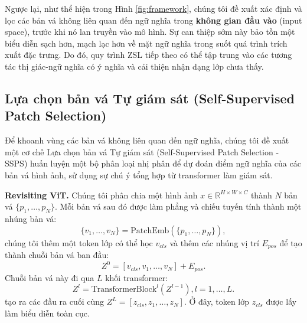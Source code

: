 Ngược lại, như thể hiện trong Hình \ref{fig:framework}, chúng tôi đề xuất xác định và lọc các bản vá không liên quan đến ngữ nghĩa trong \textbf{không gian đầu vào} (input space), trước khi nó lan truyền vào mô hình. Sự can thiệp sớm này bảo tồn một biểu diễn sạch hơn, mạch lạc hơn về mặt ngữ nghĩa trong suốt quá trình trích xuất đặc trưng. Do đó, quy trình ZSL tiếp theo có thể tập trung vào các tương tác thị giác-ngữ nghĩa có ý nghĩa và cải thiện nhận dạng lớp chưa thấy.

\subsection{Lựa chọn bản vá Tự giám sát (Self-Supervised Patch Selection)}
Để khoanh vùng các bản vá không liên quan đến ngữ nghĩa, chúng tôi đề xuất một cơ chế Lựa chọn bản vá Tự giám sát (Self-Supervised Patch Selection - SSPS) huấn luyện một bộ phân loại nhị phân để dự đoán điểm ngữ nghĩa của các bản vá hình ảnh, sử dụng sự chú ý tổng hợp từ transformer làm giám sát.

\textbf{Revisiting ViT.} Chúng tôi phân chia một hình ảnh $x \in \mathbb{R}^{H \times W \times C}$ thành $N$ bản vá $\{p_1, \dots, p_N\}$. Mỗi bản vá sau đó được làm phẳng và chiếu tuyến tính thành một nhúng bản vá:
\begin{equation}
\{v_1, \dots, v_N\} = \text{PatchEmb}(\{p_1, \dots, p_N\}),
\end{equation}
chúng tôi thêm một token lớp có thể học $v_{cls}$ và thêm các nhúng vị trí $E_{pos}$ để tạo thành chuỗi bản vá ban đầu:
\begin{equation}
Z^0 = [v_{cls}, v_1, \dots, v_N] + E_{pos}.
\end{equation}
Chuỗi bản vá này đi qua $L$ khối transformer:
\begin{equation}
Z^l = \text{TransformerBlock}^l(Z^{l-1}), l=1, \dots, L.
\end{equation}
tạo ra các đầu ra cuối cùng $Z^L = [z_{cls}, z_1, \dots, z_N]$. Ở đây, token lớp $z_{cls}$ được lấy làm biểu diễn toàn cục.

